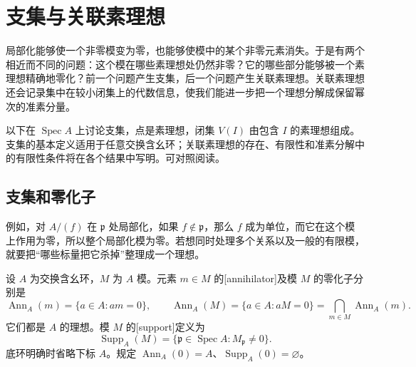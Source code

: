 
% 
% 

\section{支集与关联素理想}
\label{g5:sec:0204}

局部化能够使一个非零模变为零，也能够使模中的某个非零元素消失。于是有两个相近而不同的问题：这个模在哪些素理想处仍然非零？它的哪些部分能够被一个素理想精确地零化？前一个问题产生支集，后一个问题产生关联素理想。关联素理想还会记录集中在较小闭集上的代数信息，使我们能进一步把一个理想分解成保留幂次的准素分量。

\ProseParagraphBreak

以下在 \(\operatorname{Spec}A\) 上讨论支集，点是素理想，闭集 \(V(I)\) 由包含 \(I\) 的素理想组成。支集的基本定义适用于任意交换含幺环；关联素理想的存在、有限性和准素分解中的有限性条件将在各个结果中写明。可对照\cite[第4节，第25--26页；第6节，第38--42页]{Matsumura1989}阅读。

\subsection{支集和零化子}
\label{g5:subsec:0204:01}
例如，对 \(A/(f)\) 在 \(\mathfrak p\) 处局部化，如果 \(f\notin\mathfrak p\)，那么 \(f\) 成为单位，而它在这个模上作用为零，所以整个局部化模为零。若想同时处理多个关系以及一般的有限模，就要把“哪些标量把它杀掉”整理成一个理想。

\begin{definition}\label{g5:def:support-annihilator}
	设 \(A\) 为交换含幺环，\(M\) 为 \(A\) 模。元素 \(m\in M\) 的[annihilator]及模 \(M\) 的零化子分别是
	\[
		\operatorname{Ann}_A(m)=\{a\in A:am=0\},\qquad
		\operatorname{Ann}_A(M)=\{a\in A:aM=0\}
		=\bigcap_{m\in M}\operatorname{Ann}_A(m).
	\]
	它们都是 \(A\) 的理想。模 \(M\) 的[support]定义为
	\[
		\operatorname{Supp}_A(M)=\{\mathfrak p\in\operatorname{Spec}A:M_{\mathfrak p}\ne0\}.
	\]
	底环明确时省略下标 \(A\)。规定 \(\operatorname{Ann}_A(0)=A\)、\(\operatorname{Supp}_A(0)=\varnothing\)。
\end{definition}

